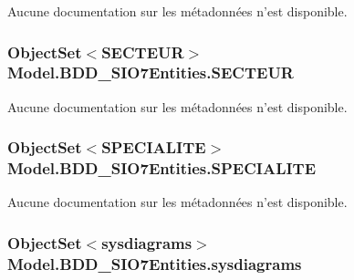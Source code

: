 Aucune documentation sur les métadonnées n'est disponible. 

\hypertarget{class_model_1_1_b_d_d___s_i_o7_entities_a6c7e5e2098c03456f950dd088b6507ef}{
\subsubsection[{S\-E\-C\-T\-E\-U\-R}]{\setlength{\rightskip}{0pt plus 5cm}Object\-Set$<${\bf S\-E\-C\-T\-E\-U\-R}$>$ Model.\-B\-D\-D\-\_\-\-S\-I\-O7\-Entities.\-S\-E\-C\-T\-E\-U\-R\hspace{0.3cm}{\ttfamily [get]}}}\label{class_model_1_1_b_d_d___s_i_o7_entities_a6c7e5e2098c03456f950dd088b6507ef}


Aucune documentation sur les métadonnées n'est disponible. 

\hypertarget{class_model_1_1_b_d_d___s_i_o7_entities_ac2e52a3850fb20c481adac53dd529ab0}{
\subsubsection[{S\-P\-E\-C\-I\-A\-L\-I\-T\-E}]{\setlength{\rightskip}{0pt plus 5cm}Object\-Set$<${\bf S\-P\-E\-C\-I\-A\-L\-I\-T\-E}$>$ Model.\-B\-D\-D\-\_\-\-S\-I\-O7\-Entities.\-S\-P\-E\-C\-I\-A\-L\-I\-T\-E\hspace{0.3cm}{\ttfamily [get]}}}\label{class_model_1_1_b_d_d___s_i_o7_entities_ac2e52a3850fb20c481adac53dd529ab0}


Aucune documentation sur les métadonnées n'est disponible. 

\hypertarget{class_model_1_1_b_d_d___s_i_o7_entities_a58f4c74a27a387297972be29496fd65b}{
\subsubsection[{sysdiagrams}]{\setlength{\rightskip}{0pt plus 5cm}Object\-Set$<${\bf sysdiagrams}$>$ Model.\-B\-D\-D\-\_\-\-S\-I\-O7\-Entities.\-sysdiagrams\hspace{0.3cm}{\ttfamily [get]}}}\label{class_model_1_1_b_d_d___s_i_o7_entities_a58f4c74a27a387297972be29496fd65b}


